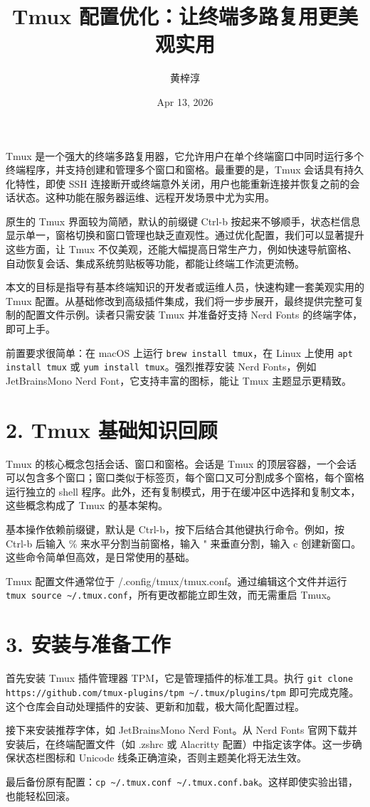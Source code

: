 \title{Tmux 配置优化：让终端多路复用更美观实用}
\author{黄梓淳}
\date{Apr 13, 2026}
\maketitle
Tmux 是一个强大的终端多路复用器，它允许用户在单个终端窗口中同时运行多个终端程序，并支持创建和管理多个窗口和窗格。最重要的是，Tmux 会话具有持久化特性，即使 SSH 连接断开或终端意外关闭，用户也能重新连接并恢复之前的会话状态。这种功能在服务器运维、远程开发场景中尤为实用。\par
原生的 Tmux 界面较为简陋，默认的前缀键 Ctrl-b 按起来不够顺手，状态栏信息显示单一，窗格切换和窗口管理也缺乏直观性。通过优化配置，我们可以显著提升这些方面，让 Tmux 不仅美观，还能大幅提高日常生产力，例如快速导航窗格、自动恢复会话、集成系统剪贴板等功能，都能让终端工作流更流畅。\par
本文的目标是指导有基本终端知识的开发者或运维人员，快速构建一套美观实用的 Tmux 配置。从基础修改到高级插件集成，我们将一步步展开，最终提供完整可复制的配置文件示例。读者只需安装 Tmux 并准备好支持 Nerd Fonts 的终端字体，即可上手。\par
前置要求很简单：在 macOS 上运行 \texttt{brew install tmux}，在 Linux 上使用 \texttt{apt install tmux} 或 \texttt{yum install tmux}。强烈推荐安装 Nerd Fonts，例如 JetBrainsMono Nerd Font，它支持丰富的图标，能让 Tmux 主题显示更精致。\par
\chapter{2. Tmux 基础知识回顾}
Tmux 的核心概念包括会话、窗口和窗格。会话是 Tmux 的顶层容器，一个会话可以包含多个窗口；窗口类似于标签页，每个窗口又可分割成多个窗格，每个窗格运行独立的 shell 程序。此外，还有复制模式，用于在缓冲区中选择和复制文本，这些概念构成了 Tmux 的基本架构。\par
基本操作依赖前缀键，默认是 Ctrl-b，按下后结合其他键执行命令。例如，按 Ctrl-b 后输入 \%{} 来水平分割当前窗格，输入 " 来垂直分割，输入 c 创建新窗口。这些命令简单但高效，是日常使用的基础。\par
Tmux 配置文件通常位于 /.config/tmux/tmux.conf。通过编辑这个文件并运行 \texttt{tmux source \~{}/.tmux.conf}，所有更改都能立即生效，而无需重启 Tmux。\par
\chapter{3. 安装与准备工作}
首先安装 Tmux 插件管理器 TPM，它是管理插件的标准工具。执行 \texttt{git clone https://github.com/tmux-plugins/tpm \~{}/.tmux/plugins/tpm} 即可完成克隆。这个仓库会自动处理插件的安装、更新和加载，极大简化配置过程。\par
接下来安装推荐字体，如 JetBrainsMono Nerd Font。从 Nerd Fonts 官网下载并安装后，在终端配置文件（如 .zshrc 或 Alacritty 配置）中指定该字体。这一步确保状态栏图标和 Unicode 线条正确渲染，否则主题美化将无法生效。\par
最后备份原有配置：\texttt{cp \~{}/.tmux.conf \~{}/.tmux.conf.bak}。这样即使实验出错，也能轻松回滚。\par
